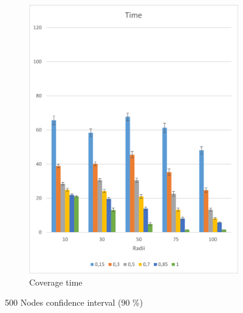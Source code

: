 \begin{figure}[H]
\begin{subfigure}{.5\textwidth}
  \includegraphics[width=1\linewidth]{./images/500TimeCI.png}
  \caption{Coverage time}
  \label{fig:sub2}
\end{subfigure}
\caption{500 Nodes confidence interval (90 \%)}
\label{fig:test}
\end{figure}

